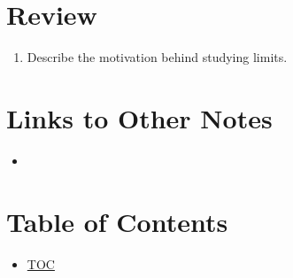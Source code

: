 \section*{Review}
\begin{enumerate}
  \item Describe the motivation behind studying limits.
\end{enumerate}

\section*{Links to Other Notes}
\begin{itemize}
  \item \hyperref[]{}
\end{itemize}

\section*{Table of Contents}
\begin{itemize}
  \item \hyperref[toc]{TOC}
\end{itemize}


